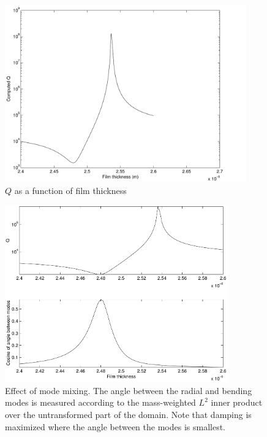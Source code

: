 \documentclass{article}
\begin{document}
\begin{figure}
  \label{Q-locus-plot}
  \begin{center}
    \includegraphics[height=3in]{Qmain1.pdf}
    \caption{$Q$ as a function of film thickness}
  \end{center}
\end{figure}

\begin{figure}
  \label{cos-theta-plot}
  \begin{center}
    \includegraphics[height=3in]{theta_plot.pdf}
    \caption{Effect of mode mixing.  The angle between the radial
             and bending modes is measured according
             to the mass-weighted $L^2$ inner product over the
             untransformed part of the domain.  Note that damping
             is maximized where the angle between the modes is smallest.}
  \end{center}
\end{figure}
\end{document}
